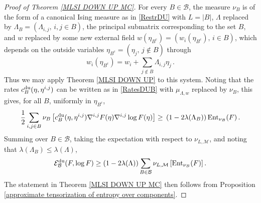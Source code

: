 \documentclass[11pt,reqno]{amsart}
\numberwithin{equation}{section}
\numberwithin{figure}{section}
\newcommand{\1}{\mathds{1}}
\let\L=\Lambda
\newcommand{\cB}{\ensuremath{\mathcal B}}
\newcommand{\cM}{\ensuremath{\mathcal M}}
\begin{document}
\begin{proof}[Proof of Theorem \ref{MLSI DOWN UP MC}]
For every $B\in\cB$, the measure $\nu_B$ is of the form of a canonical Ising measure as in \eqref{RestrDU} with $L=|B|$, $\L$ replaced by $\L_B=(\L_{i,j},\,i,j\in B)$, the principal submatrix corresponding to the set $B$, and $w$ replaced by some new external field $w(\eta_{B^c})=(w_i(\eta_{B^c}),\,i\in B)$,  which depends on the outside variables $   \eta_{B^c}=(\eta_j, \,j\notin B)$ through
\[
w_i(\eta_{B^c})=w_i+\sum_{j\notin B}\L_{i,j}\eta_j\,.
\]
 Thus we may apply Theorem \ref{MLSI DOWN UP} to this system. Noting that the rates $c^{\rm du}_B(\eta,\eta^{i,j})$ can be written as in \eqref{RatesDUB} with $\mu_{\L,w}$ replaced by $\nu_B$, this gives, for all $B$, uniformly in $\eta_{B^c}$, 
\begin{gather}\label{DirDUB2}
\frac{1}{2}\sum_{i,j\in B} \nu_{B}
\left[ c^{\rm du}_B(\eta,\eta^{i,j})\nabla^{i,j}F(\eta)\nabla^{i,j}\log F(\eta) \right]\ge \,(1 - 2\lambda(\Lambda_B))\, \mathrm{Ent}_{\nu_B}(F)\,.
\end{gather}
Summing over $B\in\cB$, taking the expectation with respect to $\nu_{L,\cM}$, and noting that $\lambda(\Lambda_B)\le \lambda(\Lambda)$,
\begin{gather}\label{DirDUB3}
\mathcal{E}^{\rm du}_\cB(F, \log F)\ge (1 - 2\lambda(\Lambda))\sum_{B\in\cB}
\nu_{L,\cM}\left[\mathrm{Ent}_{\nu_B}(F)\right].
\end{gather}
The statement in Theorem \ref{MLSI DOWN UP MC} then follows from Proposition \ref{approximate tensorization of entropy over components}.
\end{proof}

 
\end{document}
